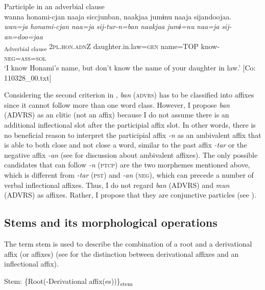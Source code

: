 \ex Participle in an adverbial clause\\\label{ex:4.20b}
\glll   wanna  honami-{\textbar}cjan{\textbar}  naaja  siccjunban, naakjaa  jumɨnu  naaja  sijandoojaa.\\
    \textit{wan=ja}  \textit{honami-cjan}  \textit{naa=ja}  \textit{sij-tur-n=ban}  \textit{naakjaa}  \textit{jumɨ=nu}  \textit{naa=ja}  \textit{sij-an=doo=jaa}\\
    [1\textsc{sg}=\textsc{top}  Honami-\textsc{dim}  name=TOP  know-\textsc{prog}-\textsc{ptcp}=\textsc{advrs}]\textsubscript{Adverbial clause}  2\textsc{pl}.\textsc{hon}.\textsc{adn}Z  daughter.in.law=\textsc{gen}  name=TOP  know-\textsc{neg}=\textsc{ass}=\textsc{sol}\\
    \glt     ‘I know Honami’s name, but don’t know the name of your daughter in law.’ [Co: 110328\_00.txt]
    \z
\z

Considering the second criterion in , \textit{ban} (\textsc{advrs}) has to be classified into affixes since it cannot follow more than one word class. However, I propose \textit{ban} (ADVRS) as an clitic (not an affix) because I do not assume there is an additional inflectional slot after the participial affix slot. In other words, there is no beneficial reason to interpret the participial affix \textit{{}-n} as an ambivalent affix that is able to both close and not close a word, similar to the past affix \textit{{}-tar} or the negative affix \textit{{}-an} (see  for discussion about ambivalent affixes). The only possible candidates that can follow \textit{{}-n} (\textsc{ptcp}) are the two morphemes mentioned above, which is different from \textit{{}-tar} (\textsc{pst}) and \textit{{}-an} (\textsc{neg}), which can precede a number of verbal inflectional affixes. Thus, I do not regard \textit{ban} (ADVRS) and \textit{mun} (ADVRS) as affixes. Rather, I propose that they are conjunctive particles (see ).

\subsection{Stems and its morphological operations}\label{sec:4.2.3}

The term stem is used to describe the combination of a root and a derivational affix (or affixes) (see  for the distinction between derivational affixes and an inflectional affix).

\ea  Stem: \{Root(-Derivational affix(es))\}\textsubscript{stem} \label{ex:4.21} \z


